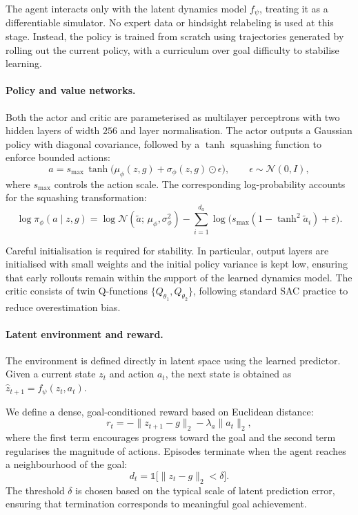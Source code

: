 The agent interacts only with the latent dynamics model $f_\psi$,
treating it as a differentiable simulator. No expert data or hindsight
relabeling is used at this stage. Instead, the policy is trained from
scratch using trajectories generated by rolling out the current policy,
with a curriculum over goal difficulty to stabilise learning.

\paragraph{Policy and value networks.}
Both the actor and critic are parameterised as multilayer perceptrons
with two hidden layers of width $256$ and layer normalisation. The actor
outputs a Gaussian policy with diagonal covariance, followed by a
$\tanh$ squashing function to enforce bounded actions:
\begin{equation}
a = s_{\max}\,\tanh\!\big(\mu_\phi(z,g) + \sigma_\phi(z,g)\odot\epsilon\big),
\qquad \epsilon \sim \mathcal{N}(0,I),
\end{equation}
where $s_{\max}$ controls the action scale. The corresponding log-probability
accounts for the squashing transformation:
\begin{equation}
\log\pi_\phi(a \mid z,g)
= \log\mathcal{N}(\tilde a;\,\mu_\phi,\sigma_\phi^2)
- \sum_{i=1}^{d_a} \log\!\big(s_{\max}(1-\tanh^2 \tilde a_i) + \varepsilon\big).
\end{equation}

Careful initialisation is required for stability. In particular, output
layers are initialised with small weights and the initial policy
variance is kept low, ensuring that early rollouts remain within the
support of the learned dynamics model. The critic consists of twin
Q-functions $\{Q_{\theta_1}, Q_{\theta_2}\}$, following standard SAC
practice to reduce overestimation bias.

\paragraph{Latent environment and reward.}
The environment is defined directly in latent space using the learned
predictor. Given a current state $z_t$ and action $a_t$, the next state
is obtained as $\hat{z}_{t+1} = f_\psi(z_t, a_t)$. 

We define a dense, goal-conditioned reward based on Euclidean distance:
\begin{equation}
r_t = -\|z_{t+1} - g\|_2 - \lambda_a \|a_t\|_2,
\end{equation}
where the first term encourages progress toward the goal and the second
term regularises the magnitude of actions. Episodes terminate when the
agent reaches a neighbourhood of the goal:
\begin{equation}
d_t = \mathbb{1}\!\big[\|z_t - g\|_2 < \delta\big].
\end{equation}
The threshold $\delta$ is chosen based on the typical scale of latent
prediction error, ensuring that termination corresponds to meaningful
goal achievement.

